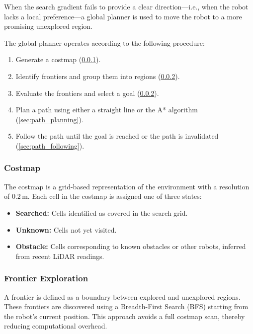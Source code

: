When the search gradient fails to provide a clear direction—i.e., when the robot lacks a local preference—a global planner is used to move the robot to a more promising unexplored region.


The global planner operates according to the following procedure:

\begin{enumerate}
  \item Generate a costmap (\cref{sec:costmap}).
  \item Identify frontiers and group them into regions (\cref{sec:frontier_exploration}).
  \item Evaluate the frontiers and select a goal (\cref{sec:frontier_exploration}).
  \item Plan a path using either a straight line or the A* algorithm (\cref{sec:path_planning}).
  \item Follow the path until the goal is reached or the path is invalidated (\cref{sec:path_following}).
\end{enumerate}

\subsubsection{Costmap}
\label{sec:costmap}
The costmap is a grid-based representation of the environment with a resolution of $0.2\,\text{m}$. Each cell in the costmap is assigned one of three states:

\begin{itemize}
  \item \textbf{Searched:} Cells identified as covered in the search grid.
  \item \textbf{Unknown:} Cells not yet visited.
  \item \textbf{Obstacle:} Cells corresponding to known obstacles or other robots, inferred from recent LiDAR readings.
\end{itemize}

\subsubsection{Frontier Exploration}
\label{sec:frontier_exploration}
A frontier is defined as a boundary between explored and unexplored regions. These frontiers are discovered using a Breadth-First Search (BFS) starting from the robot's current position. This approach avoids a full costmap scan, thereby reducing computational overhead.

